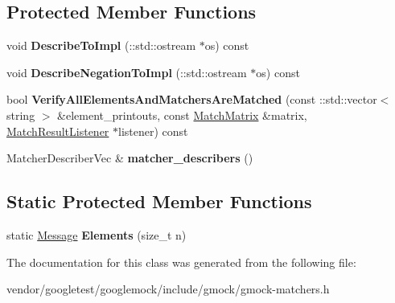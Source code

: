 \subsection*{Protected Member Functions}
\begin{DoxyCompactItemize}
\item 
void {\bfseries Describe\+To\+Impl} (\+::std\+::ostream $\ast$os) const \hypertarget{classtesting_1_1internal_1_1UnorderedElementsAreMatcherImplBase_a025abc723fc4f2788c81eb1eca3838e9}{}\label{classtesting_1_1internal_1_1UnorderedElementsAreMatcherImplBase_a025abc723fc4f2788c81eb1eca3838e9}

\item 
void {\bfseries Describe\+Negation\+To\+Impl} (\+::std\+::ostream $\ast$os) const \hypertarget{classtesting_1_1internal_1_1UnorderedElementsAreMatcherImplBase_a40998516ce516b79f99db299c58b8231}{}\label{classtesting_1_1internal_1_1UnorderedElementsAreMatcherImplBase_a40998516ce516b79f99db299c58b8231}

\item 
bool {\bfseries Verify\+All\+Elements\+And\+Matchers\+Are\+Matched} (const \+::std\+::vector$<$ string $>$ \&element\+\_\+printouts, const \hyperlink{classtesting_1_1internal_1_1MatchMatrix}{Match\+Matrix} \&matrix, \hyperlink{classtesting_1_1MatchResultListener}{Match\+Result\+Listener} $\ast$listener) const \hypertarget{classtesting_1_1internal_1_1UnorderedElementsAreMatcherImplBase_a0a12446ecc8fab75a551a77c322e7896}{}\label{classtesting_1_1internal_1_1UnorderedElementsAreMatcherImplBase_a0a12446ecc8fab75a551a77c322e7896}

\item 
Matcher\+Describer\+Vec \& {\bfseries matcher\+\_\+describers} ()\hypertarget{classtesting_1_1internal_1_1UnorderedElementsAreMatcherImplBase_a04d4adc809d9c06331f8dbb67b879ac0}{}\label{classtesting_1_1internal_1_1UnorderedElementsAreMatcherImplBase_a04d4adc809d9c06331f8dbb67b879ac0}

\end{DoxyCompactItemize}
\subsection*{Static Protected Member Functions}
\begin{DoxyCompactItemize}
\item 
static \hyperlink{classtesting_1_1Message}{Message} {\bfseries Elements} (size\+\_\+t n)\hypertarget{classtesting_1_1internal_1_1UnorderedElementsAreMatcherImplBase_ab6d5a2342e07730b913f419cf662d16a}{}\label{classtesting_1_1internal_1_1UnorderedElementsAreMatcherImplBase_ab6d5a2342e07730b913f419cf662d16a}

\end{DoxyCompactItemize}


The documentation for this class was generated from the following file\+:\begin{DoxyCompactItemize}
\item 
vendor/googletest/googlemock/include/gmock/gmock-\/matchers.\+h\end{DoxyCompactItemize}
